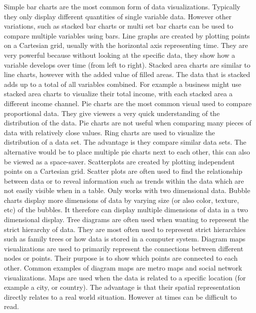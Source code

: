 Simple bar charts are the most common form of data visualizations. Typically they only display different quantities of single variable data. However other variations, such as stacked bar charts or multi set bar charts can be used to compare multiple variables using bars. Line graphs are created by plotting points on a Cartesian grid, usually with the horizontal axis representing time. They are very powerful because without looking at the specific data, they show how a variable develops over time (from left to right). Stacked area charts are similar to line charts, however with the added value of filled areas. The data that is stacked adds up to a total of all variables combined. For example a business might use stacked area charts to visualize their total income, with each stacked area a different income channel. Pie charts are the most common visual used to compare proportional data. They give viewers a very quick understanding of the distribution of the data. Pie charts are not useful when comparing many pieces of data with relatively close values. Ring charts are used to visualize the distribution of a data set. The advantage is they compare similar data sets. The alternative would be to place multiple pie charts next to each other, this can also be viewed as a space-saver. Scatterplots are created by plotting independent points on a Cartesian grid. Scatter plots are often used to find the relationship between data or to reveal information such as trends within the data which are not easily visible when in a table. Only works with two dimensional data. Bubble charts display more dimensions of data by varying size (or also color, texture, etc) of the bubbles. It therefore can display multiple dimensions of data in a two dimensional display. Tree diagrams are often used when wanting to represent the strict hierarchy of data. They are most often used to represent strict hierarchies such as family trees or how data is stored in a computer system. Diagram maps visualizations are used to primarily represent the connections between different nodes or points. Their purpose is to show which points are connected to each other. Common examples of diagram maps are metro maps and social network visualizations. Maps are used when the data is related to a specific location (for example a city, or country). The advantage is that their spatial representation directly relates to a real world situation. However at times can be difficult to read.



